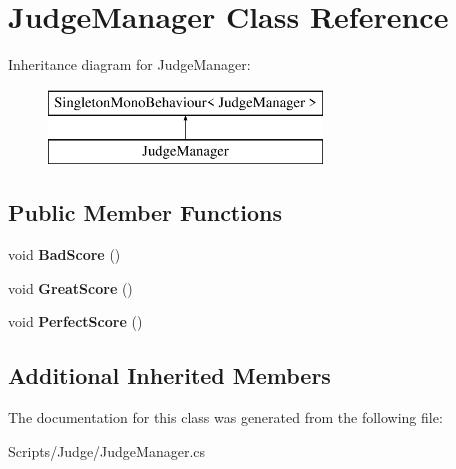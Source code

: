 \hypertarget{class_judge_manager}{}\section{Judge\+Manager Class Reference}
\label{class_judge_manager}
Inheritance diagram for Judge\+Manager\+:\begin{figure}[H]
\begin{center}
\leavevmode
\includegraphics[height=2.000000cm]{class_judge_manager}
\end{center}
\end{figure}
\subsection*{Public Member Functions}
\begin{DoxyCompactItemize}
\item 
void {\bfseries Bad\+Score} ()\hypertarget{class_judge_manager_a12ab1b4163a77c8576af6a624f914a88}{}\label{class_judge_manager_a12ab1b4163a77c8576af6a624f914a88}

\item 
void {\bfseries Great\+Score} ()\hypertarget{class_judge_manager_a714edcdb57505441801355cefcdfb2b2}{}\label{class_judge_manager_a714edcdb57505441801355cefcdfb2b2}

\item 
void {\bfseries Perfect\+Score} ()\hypertarget{class_judge_manager_a9922beeef09f3808b6941c4a09653b60}{}\label{class_judge_manager_a9922beeef09f3808b6941c4a09653b60}

\end{DoxyCompactItemize}
\subsection*{Additional Inherited Members}


The documentation for this class was generated from the following file\+:\begin{DoxyCompactItemize}
\item 
Scripts/\+Judge/Judge\+Manager.\+cs\end{DoxyCompactItemize}
